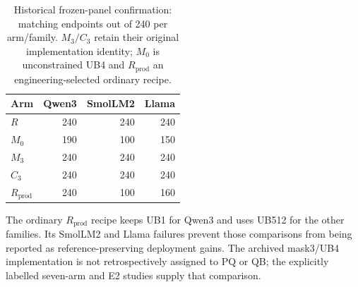 \begin{table}[t]\centering\small
\caption{Historical frozen-panel confirmation: matching endpoints out of 240 per arm/family. $M_3/C_3$ retain their original implementation identity; $M_0$ is unconstrained UB4 and $R_{\mathrm{prod}}$ an engineering-selected ordinary recipe.}
\label{tab:qualification}
\begin{tabular}{lrrr}\toprule
Arm & Qwen3 & SmolLM2 & Llama\\\midrule
$R$ &240&240&240\\
$M_0$ &190&100&150\\
$M_3$ &240&240&240\\
$C_3$ &240&240&240\\
$R_{\mathrm{prod}}$ &240&100&160\\\bottomrule
\end{tabular}
\end{table}

The ordinary $R_{\mathrm{prod}}$ recipe keeps UB1 for Qwen3 and uses UB512 for the other families. Its SmolLM2 and Llama failures prevent those comparisons from being reported as reference-preserving deployment gains. The archived mask3/UB4 implementation is not retrospectively assigned to PQ or QB; the explicitly labelled seven-arm and E2 studies supply that comparison.


